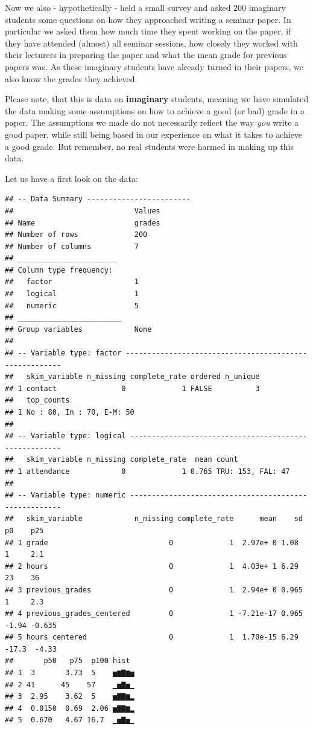 \documentclass[
]{book}
\begin{document}
Now we also - hypothetically - held a small survey and asked 200 imaginary
students some questions on how they approached writing a seminar paper. In
particular we asked them how much time they spent working on the paper, if they
have attended (almost) all seminar sessions, how closely they worked with their
lecturers in preparing the paper and what the mean grade for previous papers
was. As these imaginary students have already turned in their papers, we also
know the grades they achieved.

Please note, that this is data on \textbf{imaginary} students, meaning we have
simulated the data making some assumptions on how to achieve a good (or bad)
grade in a paper. The assumptions we made do not necessarily reflect the way
\emph{you} write a good paper, while still being based in our experience on what it
takes to achieve a good grade. But remember, no real students were harmed in
making up this data.

Let us have a first look on the data:

\begin{verbatim}
## -- Data Summary ------------------------
##                            Values
## Name                       grades
## Number of rows             200   
## Number of columns          7     
## _______________________          
## Column type frequency:           
##   factor                   1     
##   logical                  1     
##   numeric                  5     
## ________________________         
## Group variables            None  
## 
## -- Variable type: factor -------------------------------------------------------
##   skim_variable n_missing complete_rate ordered n_unique
## 1 contact               0             1 FALSE          3
##   top_counts               
## 1 No : 80, In : 70, E-M: 50
## 
## -- Variable type: logical ------------------------------------------------------
##   skim_variable n_missing complete_rate  mean count            
## 1 attendance            0             1 0.765 TRU: 153, FAL: 47
## 
## -- Variable type: numeric ------------------------------------------------------
##   skim_variable            n_missing complete_rate      mean    sd     p0    p25
## 1 grade                            0             1  2.97e+ 0 1.08    1     2.1  
## 2 hours                            0             1  4.03e+ 1 6.29   23    36    
## 3 previous_grades                  0             1  2.94e+ 0 0.965   1     2.3  
## 4 previous_grades_centered         0             1 -7.21e-17 0.965  -1.94 -0.635
## 5 hours_centered                   0             1  1.70e-15 6.29  -17.3  -4.33 
##       p50   p75  p100 hist 
## 1  3       3.73  5    ▅▆▇▆▅
## 2 41      45    57    ▁▅▇▅▁
## 3  2.95    3.62  5    ▅▇▇▆▂
## 4  0.0150  0.69  2.06 ▅▇▇▆▂
## 5  0.670   4.67 16.7  ▁▅▇▅▁
\end{verbatim}
\end{document}
